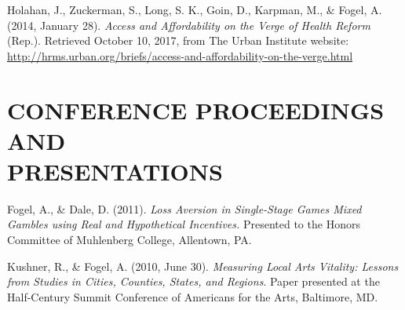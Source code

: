 \documentclass[margin, 10pt]{res} %
\begin{document}
\begin{resume}
Holahan, J., Zuckerman, S., Long, S. K., Goin, D., Karpman, M., \& Fogel, A. (2014, January 28). {\sl Access and Affordability on the Verge of Health Reform} (Rep.). Retrieved October 10, 2017, from The Urban Institute website: \url{http://hrms.urban.org/briefs/access-and-affordability-on-the-verge.html}



\section{\small\bf CONFERENCE PROCEEDINGS AND \\ PRESENTATIONS}
Fogel, A., \& Dale, D. (2011). {\sl Loss Aversion in Single-Stage Games Mixed Gambles using Real and Hypothetical Incentives.} Presented to the Honors Committee of Muhlenberg College, Allentown, PA.

Kushner, R., \& Fogel, A. (2010, June 30). {\sl Measuring Local Arts Vitality: Lessons from Studies in Cities, Counties, States, and Regions}. Paper presented at the Half-Century Summit Conference of Americans for the Arts, Baltimore, MD.



\end{resume}
\end{document}
